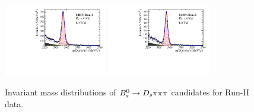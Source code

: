 \begin{figure}[h]
\includegraphics[height=!,width=0.4\textwidth]{figs/MassFit/norm_Run2_pipipi_t0.pdf}
\includegraphics[height=!,width=0.4\textwidth]{figs/MassFit/norm_Run2_pipipi_t1.pdf}
\caption{Invariant mass distributions of ${{B}^0_{s}}\rightarrow{\ensuremath{{D}_{s}}}{\ensuremath{\pi}}{\ensuremath{\pi}}{\ensuremath{\pi}}$ candidates for Run-II data.}
\label{fig:massfits_norm_Run2}
\end{figure}

\clearpage


